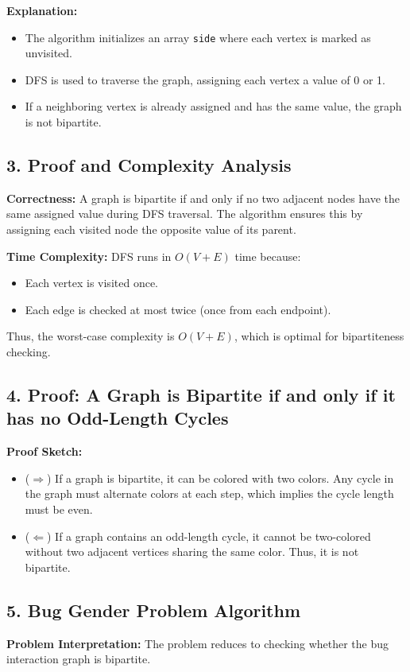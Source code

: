 \documentclass[12pt]{article}
\begin{document}
\textbf{Explanation:}
\begin{itemize}
    \item The algorithm initializes an array \texttt{side} where each vertex is marked as unvisited.
    \item DFS is used to traverse the graph, assigning each vertex a value of 0 or 1.
    \item If a neighboring vertex is already assigned and has the same value, the graph is not bipartite.
\end{itemize}

\subsection*{3. Proof and Complexity Analysis}
\textbf{Correctness:}  
A graph is bipartite if and only if no two adjacent nodes have the same assigned value during DFS traversal. The algorithm ensures this by assigning each visited node the opposite value of its parent.

\textbf{Time Complexity:}  
DFS runs in \(O(V + E)\) time because:
\begin{itemize}
    \item Each vertex is visited once.
    \item Each edge is checked at most twice (once from each endpoint).
\end{itemize}
Thus, the worst-case complexity is \(O(V + E)\), which is optimal for bipartiteness checking.

\subsection*{4. Proof: A Graph is Bipartite if and only if it has no Odd-Length Cycles}
\textbf{Proof Sketch:}
\begin{itemize}
    \item (\(\Rightarrow\)) If a graph is bipartite, it can be colored with two colors. Any cycle in the graph must alternate colors at each step, which implies the cycle length must be even.
    \item (\(\Leftarrow\)) If a graph contains an odd-length cycle, it cannot be two-colored without two adjacent vertices sharing the same color. Thus, it is not bipartite.
\end{itemize}

\subsection*{5. Bug Gender Problem Algorithm}
\textbf{Problem Interpretation:}  
The problem reduces to checking whether the bug interaction graph is bipartite.
\end{document}
